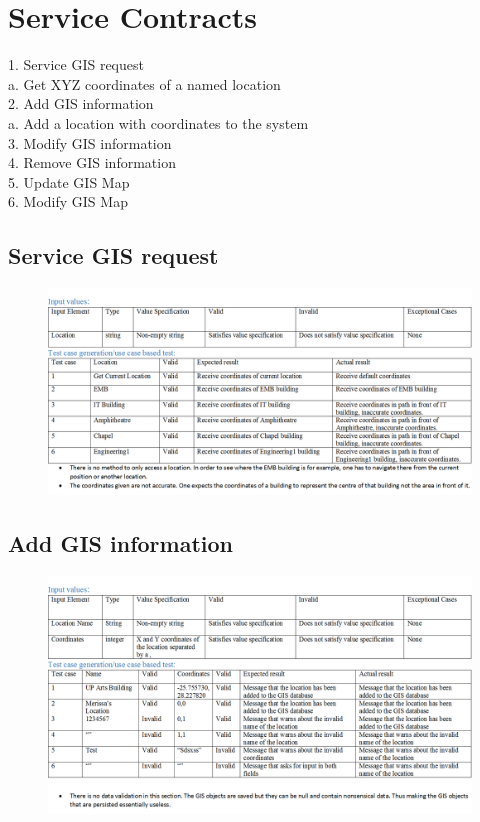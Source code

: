\documentclass[english]{article}
\begin{document}
\section{Service Contracts}
1.	Service GIS request\\
	a.	Get XYZ coordinates of a named location\\
2.	Add GIS information\\
	a.	Add a location with coordinates to the system\\
3.	Modify GIS information\\
4.	Remove GIS information\\
5.	Update GIS Map\\
6.	Modify GIS Map\\
\subsection{Service GIS request}
\begin{figure}[ht!]
\hspace*{-2.5cm} 
\includegraphics[width=180mm]{ServiceGISReq.png}
\end{figure}
\subsection{Add GIS information}
\begin{figure}[ht!]
\hspace*{-2.5cm} 
\includegraphics[width=180mm]{AddGISInformation.png}
\end{figure}
\end{document}
